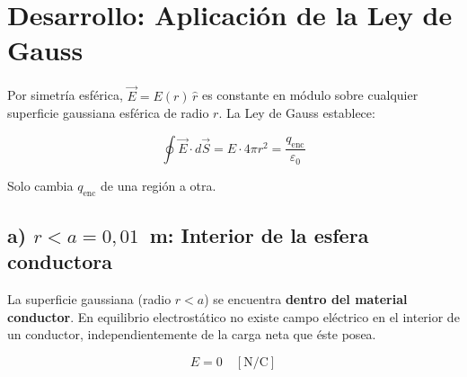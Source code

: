 \documentclass[12pt,letterpaper]{article}
\begin{document}
\section*{Desarrollo: Aplicaci\'on de la Ley de Gauss}

Por simetr\'ia esf\'erica, $\vec{E} = E(r)\,\hat{r}$ es constante en m\'odulo sobre cualquier
superficie gaussiana esf\'erica de radio $r$. La Ley de Gauss establece:

\[
    \oint \vec{E}\cdot d\vec{S} = E\cdot 4\pi r^2 = \frac{q_\text{enc}}{\varepsilon_0}
\]

Solo cambia $q_\text{enc}$ de una regi\'on a otra.

\bigskip

\subsection*{a) $r < a = 0{,}01$~m: Interior de la esfera conductora}

\noindent
\begin{minipage}[c]{0.30\textwidth}
\centering
{}
\end{minipage}%
\hfill
\begin{minipage}[c]{0.67\textwidth}
La superficie gaussiana (radio $r < a$) se encuentra \textbf{dentro del material conductor}.
En equilibrio electrost\'atico no existe campo el\'ectrico en el interior de un conductor,
independientemente de la carga neta que \'este posea.

\[
    \boxed{E = 0 \quad [\text{N/C}]}
\]
\end{minipage}
\end{document}
